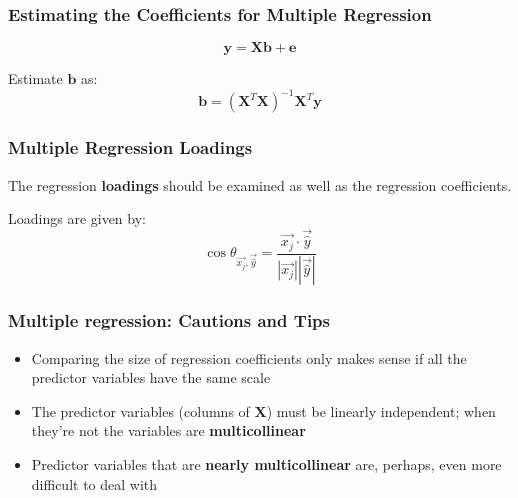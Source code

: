 \documentclass{beamer}
\newcommand{\Mtx}[1]{\ensuremath{\mathbf{#1}}}
\begin{document}
\begin{frame}
  \frametitle{Estimating the Coefficients for Multiple Regression}


$$  
\Mtx{y} = \Mtx{X}\Mtx{b} + \Mtx{e}
$$
\bigskip

Estimate \Mtx{b} as:
$$
\Mtx{b} = (\Mtx{X}^T \Mtx{X})^{-1}\Mtx{X}^T\Mtx{y}
$$

\end{frame}
\begin{frame}
  \frametitle{Multiple Regression Loadings}


The regression \textbf{loadings} should be examined as well as the regression coefficients. 

\begin{center}
\end{center}

Loadings are given by:
		\[
		\cos \theta_{\vec{x_j},\vec{\widehat{y}}} = \frac{\vec{x_j} \cdot \vec{\widehat{y}}}{|\vec{x_j}||\vec{\widehat{y}}|}
		\]
		
		
\end{frame}




\begin{frame}
  \frametitle{Multiple regression: Cautions and Tips}


\begin{itemize}
    \item Comparing the size of regression coefficients only makes sense if all the predictor variables have the same scale
	\item The predictor variables  (columns of $\Mtx{X}$) must be linearly independent; when they're not the variables are \textbf{multicollinear}
	\item Predictor variables that are \textbf{nearly multicollinear} are, perhaps, even more difficult to deal with
\end{itemize}

\end{frame}

\end{document}
